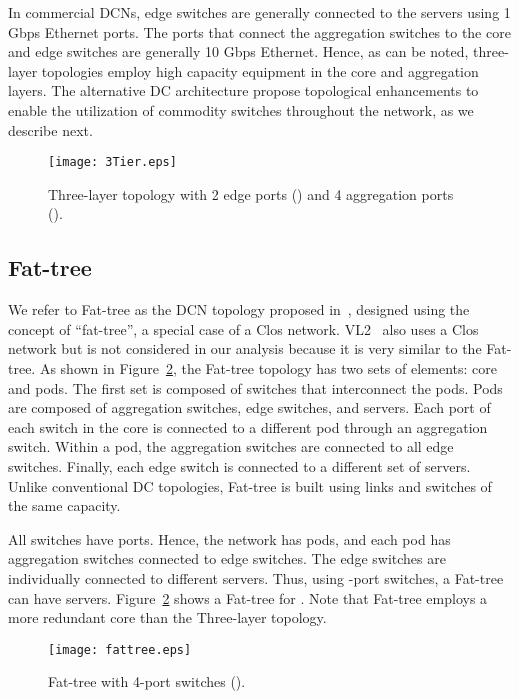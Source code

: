 In commercial DCNs, edge switches are generally connected to the servers using 1 Gbps Ethernet ports. The ports that connect the aggregation switches to the core and edge switches are generally 10 Gbps Ethernet.
Hence, as can be noted, three-layer topologies employ high capacity equipment in the core and aggregation layers. The alternative DC architecture propose topological enhancements to enable the utilization of commodity switches throughout the network, as we describe next.
\begin{figure}
\centering
\texttt{[image: 3Tier.eps]}
\caption{Three-layer topology with 2 edge ports () and 4 aggregation ports ().}
\label{fig:conventional}
\end{figure}

\subsection{Fat-tree}
\label{Fat-tree}

We refer to Fat-tree as the DCN topology proposed in~\cite{al2008scalable}, designed using the concept of ``fat-tree'', a special case of a Clos network. VL2~\cite{greenberg2009vl2} also uses a Clos network but is not considered in our analysis because it is very similar to the Fat-tree. 
As shown in Figure~\ref{fig:fatTree}, the Fat-tree topology has two sets of elements: core and pods.
The first set is composed of switches that interconnect the pods. Pods are composed of aggregation switches, edge switches, and servers. Each port of each switch in the core is connected to a different pod through an aggregation switch. Within a pod, the aggregation switches are connected to all edge switches.
Finally, each edge switch is connected to a different set of servers. Unlike conventional DC topologies, Fat-tree is built using links and switches of the same capacity.

All switches have  ports. Hence, the network has  pods, and each pod has  aggregation
switches connected to  edge switches. The edge switches are individually connected to  different servers. Thus, using -port switches, a Fat-tree can have  servers.
Figure~\ref{fig:fatTree} shows a Fat-tree for . Note that Fat-tree employs a more redundant core than the Three-layer topology.
\begin{figure}
\centering
\texttt{[image: fattree.eps]}
\caption{Fat-tree with 4-port switches ().}
\label{fig:fatTree}
\end{figure}

